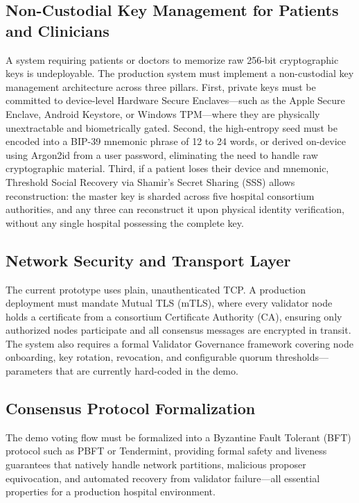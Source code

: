\documentclass[12pt]{article}
\begin{document}
\subsection{Non-Custodial Key Management for Patients and Clinicians}

A system requiring patients or doctors to memorize raw 256-bit cryptographic keys is undeployable. The production system must implement a non-custodial key management architecture across three pillars. First, private keys must be committed to device-level Hardware Secure Enclaves---such as the Apple Secure Enclave, Android Keystore, or Windows TPM---where they are physically unextractable and biometrically gated. Second, the high-entropy seed must be encoded into a BIP-39 mnemonic phrase of 12 to 24 words, or derived on-device using Argon2id from a user password, eliminating the need to handle raw cryptographic material. Third, if a patient loses their device and mnemonic, Threshold Social Recovery via Shamir's Secret Sharing (SSS) allows reconstruction: the master key is sharded across five hospital consortium authorities, and any three can reconstruct it upon physical identity verification, without any single hospital possessing the complete key.

\subsection{Network Security and Transport Layer}

The current prototype uses plain, unauthenticated TCP. A production deployment must mandate Mutual TLS (mTLS), where every validator node holds a certificate from a consortium Certificate Authority (CA), ensuring only authorized nodes participate and all consensus messages are encrypted in transit. The system also requires a formal Validator Governance framework covering node onboarding, key rotation, revocation, and configurable quorum thresholds---parameters that are currently hard-coded in the demo.

\subsection{Consensus Protocol Formalization}

The demo voting flow must be formalized into a Byzantine Fault Tolerant (BFT) protocol such as PBFT or Tendermint, providing formal safety and liveness guarantees that natively handle network partitions, malicious proposer equivocation, and automated recovery from validator failure---all essential properties for a production hospital environment.
\end{document}
